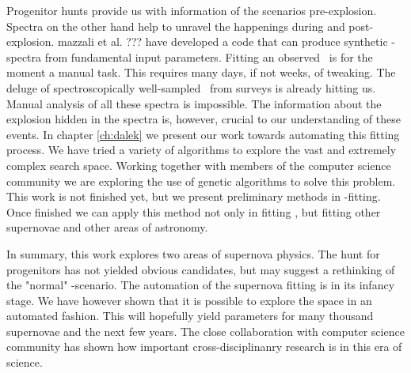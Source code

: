 Progenitor hunts provide us with information of the scenarios pre-explosion. Spectra on the other hand help to unravel the happenings during and post-explosion. mazzali et al. ??? have developed a code that can produce synthetic \snia-spectra from fundamental input parameters. Fitting an observed \snia\ is for the moment a manual task. This requires many days, if not weeks, of tweaking. The deluge of spectroscopically well-sampled \sneia\ from surveys is already hitting us. Manual analysis of all these spectra is impossible. The information about the explosion hidden in the spectra is, however, crucial to our understanding of these events. In chapter \ref{ch:dalek} we present our work towards automating this fitting process. We have tried a variety of algorithms to explore the vast and extremely complex search space. Working together with members of the computer science community we are exploring the use of genetic algorithms to solve this problem. 
This work is not finished yet, but we present preliminary methods in \snia-fitting. Once finished we can apply this method not only in fitting \snia, but fitting other supernovae and other areas of astronomy. 

In summary, this work explores two areas of supernova physics. The hunt for progenitors has not yielded obvious candidates, but may suggest a rethinking of the "normal" \sd-scenario. The automation of the supernova fitting is in its infancy stage. We have however shown that it is possible to explore the space in an automated fashion. This will hopefully yield parameters for many thousand supernovae and the next few years. 
The close collaboration with computer science community has shown how important cross-disciplinanry research is in this era of science. 


